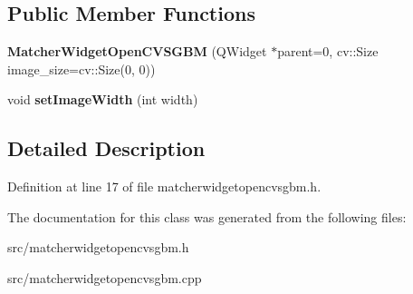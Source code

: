 \subsection*{Public Member Functions}
\begin{DoxyCompactItemize}
\item 
\hypertarget{class_matcher_widget_open_c_v_s_g_b_m_a86cb7fbd720567c33abf2548c7cf8589}{}{\bfseries Matcher\+Widget\+Open\+C\+V\+S\+G\+B\+M} (Q\+Widget $\ast$parent=0, cv\+::\+Size image\+\_\+size=cv\+::\+Size(0, 0))\label{class_matcher_widget_open_c_v_s_g_b_m_a86cb7fbd720567c33abf2548c7cf8589}

\item 
\hypertarget{class_matcher_widget_open_c_v_s_g_b_m_ab3a74b9e526e919475065fd8953c49c2}{}void {\bfseries set\+Image\+Width} (int width)\label{class_matcher_widget_open_c_v_s_g_b_m_ab3a74b9e526e919475065fd8953c49c2}

\end{DoxyCompactItemize}


\subsection{Detailed Description}


Definition at line 17 of file matcherwidgetopencvsgbm.\+h.



The documentation for this class was generated from the following files\+:\begin{DoxyCompactItemize}
\item 
src/matcherwidgetopencvsgbm.\+h\item 
src/matcherwidgetopencvsgbm.\+cpp\end{DoxyCompactItemize}
